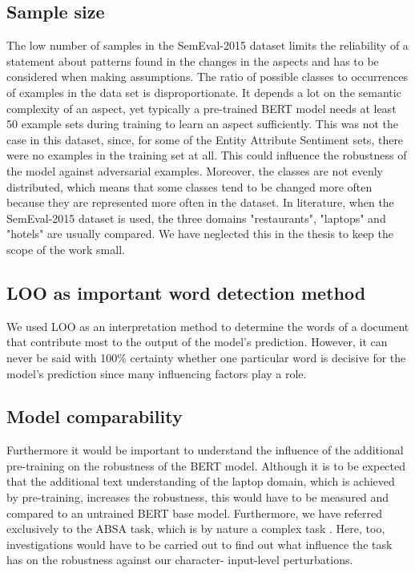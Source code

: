 \subsection{Sample size}
The low number of samples in the SemEval-2015 dataset limits the reliability of a statement about patterns found in the changes in the aspects and has to be considered when making assumptions. The ratio of possible classes to occurrences of examples in the data set is disproportionate. It depends a lot on the semantic complexity of an aspect, yet typically a pre-trained BERT model needs at least 50 example sets during training to learn an aspect sufficiently. This was not the case in this dataset, since, for some of the Entity Attribute Sentiment sets, there were no examples in the training set at all. This could influence the robustness of the model against adversarial examples.
Moreover, the classes are not evenly distributed, which means that some classes tend to be changed more often because they are represented more often in the dataset. 
In literature, when the SemEval-2015 dataset is used, the three domains "restaurants", "laptops" and "hotels" are usually compared. We have neglected this in the thesis to keep the scope of the work small.
\subsection{LOO as important word detection method}
We used LOO as an interpretation method to determine the words of a document that contribute most to the output of the model's prediction. However, it can never be said with 100\% certainty whether one particular word is decisive for the model's prediction since many influencing factors play a role. 

\subsection{Model comparability}
Furthermore it would be important to understand the influence of the additional pre-training on the robustness of the BERT model. Although it is to be expected that the additional text understanding of the laptop domain, which is achieved by pre-training, increases the robustness, this would have to be measured and compared to an untrained BERT base model. 
Furthermore, we have referred exclusively to the ABSA task, which is by nature a complex task \cite{pavlopoulos2014aspect}. Here, too, investigations would have to be carried out to find out what influence the task has on the robustness against our character- input-level perturbations.


